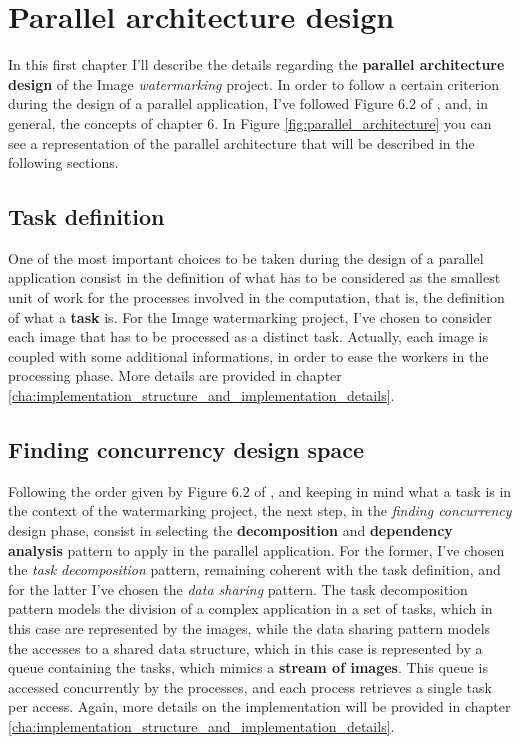 \chapter{Parallel architecture design} %
\label{cha:parallel_architecture_design}
    In this first chapter I'll describe the details regarding the \textbf{parallel architecture design} of
    the Image \textit{watermarking} project. In order to follow a certain criterion during the design of a
    parallel application, I've followed Figure $6.2$ of \cite{DSPM}, and, in general, the
    concepts of chapter $6$. In Figure \ref{fig:parallel_architecture} you can see a representation of the
    parallel architecture that will be described in the following sections.

    \section{Task definition} %
    \label{sec:task_definition}
        One of the most important choices to be taken during the design of a parallel application consist in the
        definition of what has to be considered as the smallest unit of work for the processes involved in the
        computation, that is, the definition of what a \textbf{task} is. For the Image watermarking project,
        I've chosen to consider each image that has to be processed as a distinct task. Actually, each image is
        coupled with some additional informations, in order to ease the workers in the processing phase. More
        details are provided in chapter \ref{cha:implementation_structure_and_implementation_details}.

    \section{Finding concurrency design space} %
    \label{sec:finding_concurrency_design_space}
        Following the order given by Figure $6.2$ of \cite{DSPM}, and keeping in mind what a task is in the
        context of the watermarking project, the next step, in the \textit{finding concurrency} design phase,
        consist in selecting the \textbf{decomposition} and \textbf{dependency analysis} pattern to apply in the
        parallel application. For the former, I've chosen the \textit{task decomposition} pattern, remaining
        coherent with the task definition, and for the latter I've chosen the \textit{data sharing} pattern.
        The task decomposition pattern models the division of a complex application in a set of tasks, which in
        this case are represented by the images, while the data sharing pattern models the accesses to a shared
        data structure, which in this case is represented by a queue containing the tasks, which mimics a
        \textbf{stream of images}. This queue is accessed concurrently by the processes, and each
        process retrieves a single task per access. Again, more details on the implementation
        will be provided in chapter \ref{cha:implementation_structure_and_implementation_details}.

